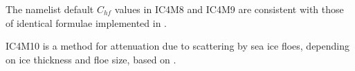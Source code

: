 The namelist default $C_{hf}$ values in {\code IC4M8} and {\code IC4M9} are consistent with those of identical formulae implemented in \cite{man:SWAN4145A}.

{\code IC4M10} is a method for attenuation due to scattering by sea ice floes, depending on ice thickness and floe size, based on \cite{art:MHB21}.
